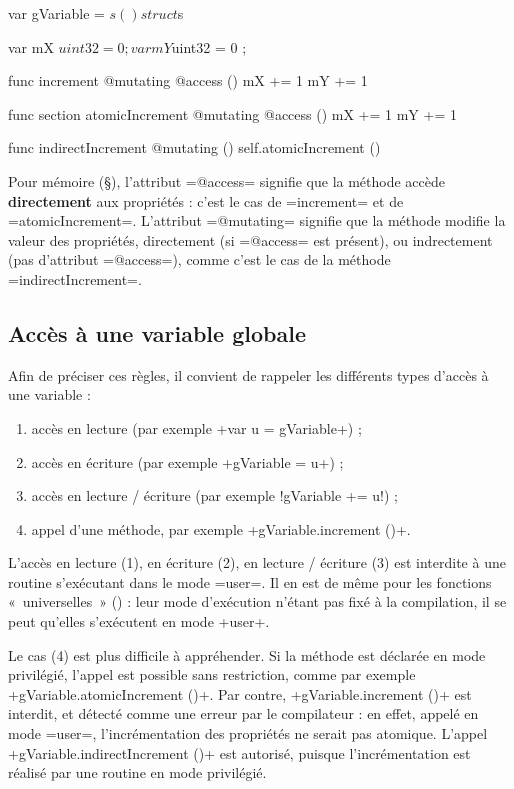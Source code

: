 \begin{PLM}
var gVariable = $s ()

struct $s {
  var mX $uint32 = 0 ;
  var mY $uint32 = 0 ;
  
  func increment @mutating @access () {
    mX += 1
    mY += 1
  }

  func section atomicIncrement @mutating @access () {
    mX += 1
    mY += 1
  }

  func indirectIncrement @mutating () {
    self.atomicIncrement ()
  }
}
\end{PLM}

Pour mémoire (§), l'attribut \plm=@access= signifie que la méthode accède {\bf directement} aux propriétés : c'est le cas de \plm=increment= et de \plm=atomicIncrement=. L'attribut \plm=@mutating= signifie que la méthode modifie la valeur des propriétés, directement (si \plm=@access= est présent), ou indrectement (pas d'attribut \plm=@access=), comme c'est le cas de la méthode \plm=indirectIncrement=.

\subsection{Accès à une variable globale}


Afin de préciser ces règles, il convient de rappeler les différents types d'accès à une variable :
\begin{enumerate}[label=(\arabic*)]
  \item accès en lecture (par exemple \plm+var u = gVariable+) ;
  \item accès en écriture (par exemple \plm+gVariable = u+) ;
  \item accès en lecture / écriture (par exemple \plm!gVariable += u!) ;
  \item appel d'une méthode, par exemple \plm+gVariable.increment ()+.
\end{enumerate}

L'accès en lecture (1), en écriture (2), en lecture / écriture (3) est interdite à une routine s'exécutant dans le mode \plm=user=. Il en est de même pour les fonctions «~universelles~» () : leur mode d'exécution n'étant pas fixé à la compilation, il se peut qu'elles s'exécutent en mode \plm+user+.

Le cas (4) est plus difficile à appréhender. Si la méthode est déclarée en mode privilégié, l'appel est possible sans restriction, comme par exemple \plm+gVariable.atomicIncrement ()+. Par contre, \plm+gVariable.increment ()+ est interdit, et détecté comme une erreur par le compilateur : en effet, appelé en mode \plm=user=, l'incrémentation des propriétés ne serait pas atomique. L'appel \plm+gVariable.indirectIncrement ()+ est autorisé, puisque l'incrémentation est réalisé par une routine en mode privilégié.

